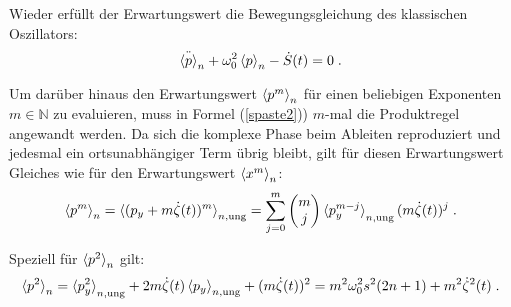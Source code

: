     Wieder erfüllt der Erwartungswert die Bewegungsgleichung des klassischen Oszillators:
    \begin{equation}
      \ddot{\braket{p}}_n + \omega_0^2\braket{p}_n - \dot{S}(t) = 0 \; .
    \end{equation}
\iffalse
    Wie an (\ref{spaste2}) zu sehen, ist es darüber hinaus einfach den Erwartungswert $\braket{p^m}_n$ für einen beliebigen Exponenten $m \in \mathbb{N}$ zu evaluieren.
    Wir können auf dem gleichen Weg die Produktregel anwenden, und erhalten wieder den ungetrieben Erwartungswert $\braket{p^m_y}_n$ aber diesmal zusätzlich die $m$-fache Anwendung des Operators auf die komplexe Phase, was wir sofort verallgemeinert aufschreiben können, da sich die komplexe Phase beim Ableiten nur reproduziert, weil immer der ortsunabhängige Term $m\dot{\zeta(t)}$ übrig bleibt.
    Es folgt:
    \begin{equation}
      \braket{p^m}_n = \braket{p^m_y}_{n,\text{ung}} + (m\dot{\zeta}(t))^m \; .
    \end{equation}
    Speziell für $m=2$ gilt:
    \begin{equation}
      \braket{p^2}_n = \braket{p^2_y}_{n,\text{ung}} + (m\dot{\zeta}(t))^2 = m^2\omega^2_0 s^2(2n+1) + m^2\dot{\zeta}^2(t) \; .
      \label{erwartungswert_p^2_einzelner}
    \end{equation}
\fi
    Um darüber hinaus den Erwartungswert $\braket{p^m}_n$ für einen beliebigen Exponenten $m \in \mathbb{N}$ zu evaluieren, muss in Formel (\ref{spaste2})) $m$-mal die Produktregel angewandt werden.
    Da sich die komplexe Phase beim Ableiten reproduziert und jedesmal ein ortsunabhängiger Term übrig bleibt, gilt für diesen Erwartungswert Gleiches wie für den Erwartungswert $\braket{x^m}_n$:
    \begin{equation}
        \braket{p^m}_n = \braket{(p_y+m\dot\zeta(t))^m}_{n,\text{ung}} = \sum_{j=0}^m\begin{pmatrix} m \\ j \\ \end{pmatrix} \braket{p_y^{m-j}}_{n,\text{ung}}(m\dot\zeta(t))^j \; .
        \label{erwartungswert_p^m_einzelner}
    \end{equation}

    Speziell für $\braket{p^2}_n$ gilt:
    \begin{equation}
      \braket{p^2}_n = \braket{p^2_y}_{n,\text{ung}} +2m\dot\zeta(t)\braket{p_y}_{n,\text{ung}}+(m\dot{\zeta}(t))^2 = m^2\omega^2_0 s^2(2n+1) + m^2\dot{\zeta}^2(t) \; .
      \label{erwartungswert_p^2_einzelner}
    \end{equation}



